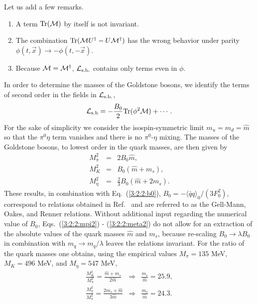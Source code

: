 \documentclass[twoside,12pt]{article}
\begin{document}
   Let us add a few remarks.
\begin{enumerate}
\item A term $\mbox{Tr}({\cal M})$ by itself is not invariant.
\item The combination $\mbox{Tr}({\cal M}U^\dagger-U {\cal M}^\dagger)$ has the wrong
behavior under parity $\phi(t,\vec{x})\to-\phi(t,-\vec{x})$.
\item Because ${\cal M}={\cal M}^\dagger$, ${\cal L}_{\rm s.b.}$ contains only terms even
in $\phi$.
\end{enumerate}
   In order to determine the masses of the Goldstone bosons, we identify the
terms of second order in the fields in ${\cal L}_{\rm s.b.}$,
\begin{equation}
\label{3:2:2:lmzo}
{\cal L}_{\rm s.b}=-\frac{B_0}{2}\mbox{Tr}(\phi^2{\cal M}) +\cdots.
\end{equation}
   For the sake of simplicity we consider the isospin-symmetric limit
$m_u=m_d=\hat m$ so that the $\pi^0\eta$ term vanishes and there is no
$\pi^0$-$\eta$ mixing.
   The masses of the Goldstone bosons, to lowest order in
the quark masses, are then given by
\begin{eqnarray}
\label{3:2:2:mpi2}
M^2_\pi&=&2 B_0 \hat m,\\
\label{3:2:2:mk2}
M^2_K&=&B_0(\hat m+m_s),\\
\label{3:2:2:meta2}
M^2_\eta&=&\frac{2}{3} B_0\left(\hat m+2m_s\right).
\end{eqnarray}
   These results, in combination with Eq.\ (\ref{3:2:2:b0}),
$B_0=-\langle\bar{q}q\rangle_0/(3 F_0^2)$, correspond to relations
obtained in Ref.\ \cite{Gell-Mann:rz:3} and are referred to as the
Gell-Mann, Oakes, and Renner relations.
   Without additional input regarding the numerical value of $B_0$,
Eqs.\ (\ref{3:2:2:mpi2}) - (\ref{3:2:2:meta2}) do not allow for an extraction of
the  absolute values of the quark masses $\hat m$ and $m_s$, because re-scaling
$B_0\to \lambda B_0$ in combination with $m_q\to m_q/\lambda$ leaves the
relations invariant.
   For the ratio of the quark masses one obtains, using the empirical values
$M_\pi=135$ MeV, $M_K=496$ MeV,
and $M_\eta=547$ MeV,
\begin{eqnarray}
\frac{M^2_K}{M^2_\pi}=\frac{\hat m+m_s}{2\hat m}&\Rightarrow&\frac{m_s}{\hat m}=25.9,
\nonumber\\
\frac{M^2_\eta}{M^2_\pi}=\frac{2m_s+\hat m}{3\hat m}&\Rightarrow&\frac{m_s}{\hat m}=24.3.
\end{eqnarray}
\end{document}
